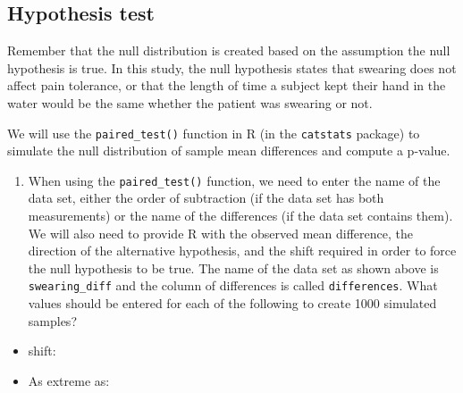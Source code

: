 \documentclass[
]{report}
\providecommand{\tightlist}{%
  \setlength{\itemsep}{0pt}\setlength{\parskip}{0pt}}
\begin{document}
\vspace{1in}

\subsection*{Hypothesis test}\label{hypothesis-test-4}

Remember that the null distribution is created based on the assumption the null hypothesis is true. In this study, the null hypothesis states that swearing does not affect pain tolerance, or that the length of time a subject kept their hand in the water would be the same whether the patient was swearing or not.

We will use the \texttt{paired\_test()} function in R (in the \texttt{catstats} package) to simulate the null distribution of sample mean differences and compute a p-value.

\newpage

\begin{enumerate}
\def\labelenumi{\arabic{enumi}.}
\setcounter{enumi}{8}
\tightlist
\item
  When using the \texttt{paired\_test()} function, we need to enter the name of the data set, either the order of subtraction (if the data set has both measurements) or the name of the differences (if the data set contains them). We will also need to provide R with the observed mean difference, the direction of the alternative hypothesis, and the shift required in order to force the null hypothesis to be true. The name of the data set as shown above is \texttt{swearing\_diff} and the column of differences is called \texttt{differences}. What values should be entered for each of the following to create 1000 simulated samples?
\end{enumerate}

\vspace{1mm}

\begin{itemize}
\tightlist
\item
  shift:
\end{itemize}

\vspace{.1in}

\begin{itemize}
\tightlist
\item
  As extreme as:
\end{itemize}

\vspace{.1in}
\end{document}
